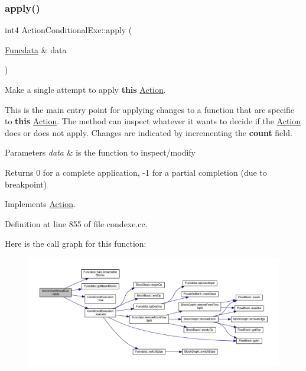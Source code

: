 \subsubsection{\texorpdfstring{apply()}{apply()}}
{\footnotesize\ttfamily int4 Action\+Conditional\+Exe\+::apply (\begin{DoxyParamCaption}\item[{\mbox{\hyperlink{class_funcdata}{Funcdata}} \&}]{data }\end{DoxyParamCaption})\hspace{0.3cm}{\ttfamily [virtual]}}



Make a single attempt to apply {\bfseries{this}} \mbox{\hyperlink{class_action}{Action}}. 

This is the main entry point for applying changes to a function that are specific to {\bfseries{this}} \mbox{\hyperlink{class_action}{Action}}. The method can inspect whatever it wants to decide if the \mbox{\hyperlink{class_action}{Action}} does or does not apply. Changes are indicated by incrementing the {\bfseries{count}} field. 
\begin{DoxyParams}{Parameters}
{\em data} & is the function to inspect/modify \\
\hline
\end{DoxyParams}
\begin{DoxyReturn}{Returns}
0 for a complete application, -\/1 for a partial completion (due to breakpoint) 
\end{DoxyReturn}


Implements \mbox{\hyperlink{class_action_aac1c3999d6c685b15f5d9765a4d04173}{Action}}.



Definition at line 855 of file condexe.\+cc.

Here is the call graph for this function\+:
\nopagebreak
\begin{figure}[H]
\begin{center}
\leavevmode
\includegraphics[width=350pt]{class_action_conditional_exe_a8625b7608a9c03ab7a70b1a7ae4d34ea_cgraph}
\end{center}
\end{figure}
\mbox{\label{class_action_conditional_exe_af0f575a8caa8a1dce2557f5abddec8e4}} 
